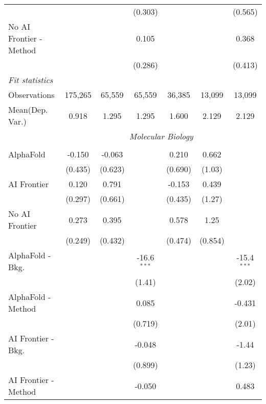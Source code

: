 \begin{tabular}{lcccccc}
                           &         &         & (0.303) &         &         & (0.565)\\   
   No AI Frontier - Method &         &         & 0.105   &         &         & 0.368\\   
                           &         &         & (0.286) &         &         & (0.413)\\   
   \midrule
   \emph{Fit statistics}\\
   Observations            & 175,265 & 65,559  & 65,559  & 36,385  & 13,099  & 13,099\\  
Mean(Dep. Var.) & 0.918 & 1.295 & 1.295 & 1.600 & 2.129 & 2.129 \\
   
 & \multicolumn{6}{c}{\textit{Molecular Biology}} \\ \\
   AlphaFold               & -0.150  & -0.063  &               & 0.210   & 0.662   &   \\   
                           & (0.435) & (0.623) &               & (0.690) & (1.03)  &   \\   
   AI Frontier             & 0.120   & 0.791   &               & -0.153  & 0.439   &   \\   
                           & (0.297) & (0.661) &               & (0.435) & (1.27)  &   \\   
   No AI Frontier          & 0.273   & 0.395   &               & 0.578   & 1.25    &   \\   
                           & (0.249) & (0.432) &               & (0.474) & (0.854) &   \\   
   AlphaFold - Bkg.        &         &         & -16.6$^{***}$ &         &         & -15.4$^{***}$\\   
                           &         &         & (1.41)        &         &         & (2.02)\\   
   AlphaFold - Method      &         &         & 0.085         &         &         & -0.431\\   
                           &         &         & (0.719)       &         &         & (2.01)\\   
   AI Frontier - Bkg.      &         &         & -0.048        &         &         & -1.44\\   
                           &         &         & (0.899)       &         &         & (1.23)\\   
   AI Frontier - Method    &         &         & -0.050        &         &         & 0.483\\   

\end{tabular}
